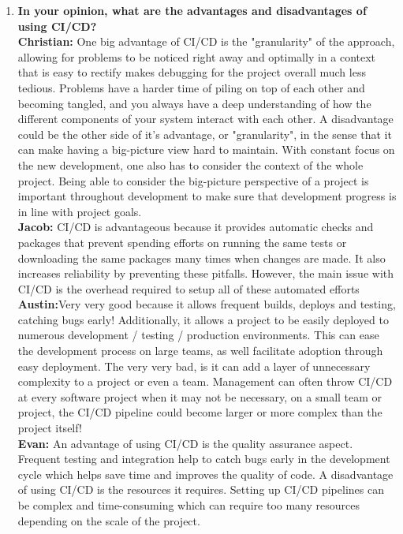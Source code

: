 \documentclass{article}
\begin{document}
\begin{enumerate}
  \item \textbf{In your opinion, what are the advantages and disadvantages of using CI/CD?}\\

  \textbf{Christian:} One big advantage of CI/CD is the "granularity" of the approach, allowing for problems to be noticed right away and optimally in a context that is easy to rectify makes debugging for the project overall much less tedious. Problems have a harder time of piling on top of each other and becoming tangled, and you always have a deep understanding of how the different components of your system interact with each other. A disadvantage could be the other side of it's advantage, or "granularity", in the sense that it can make having a big-picture view hard to maintain. With constant focus on the new development, one also has to consider the context of the whole project. Being able to consider the big-picture perspective of a project is important throughout development to make sure that development progress is in line with project goals.\\

  \textbf{Jacob:}  CI/CD is advantageous because it provides automatic checks and packages that prevent spending efforts on running the same tests or downloading the same packages many times when changes are made. It also increases reliability by preventing these pitfalls. However, the main issue with CI/CD is the overhead required to setup all of these automated efforts\\

  \textbf{Austin:}Very very good because it allows frequent builds, deploys and testing, catching bugs early! Additionally, it allows a project to be easily deployed to numerous development / testing / production environments. This can ease the development process on large teams, as well facilitate adoption through easy deployment. The very very bad, is it can add a layer of unnecessary complexity to a project or even a team. Management can often throw CI/CD at every software project when it may not be necessary, on a small team or project, the CI/CD pipeline could become larger or more complex than the project itself!\\

  \textbf{Evan:} An advantage of using CI/CD is the quality assurance aspect. Frequent testing and integration help to catch bugs early in the development cycle which helps save time and improves the quality of code. A disadvantage of using CI/CD is the resources it requires. Setting up CI/CD pipelines can be complex and time-consuming which can require too many resources depending on the scale of the project.


\end{enumerate}
\end{document}

